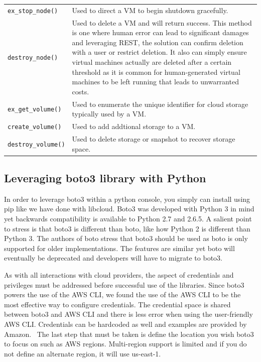 \begin{table}[htb]
\begin{tabular} {p{2.5cm}|p{5cm}}
\verb|ex_stop_node()| & Used to direct a VM to begin shutdown gracefully.\\

\verb|destroy_node()| & Used to delete a VM and will return success. This
method is
one where human error can lead to significant damages and leveraging REST, the
solution can confirm deletion with a user or restrict deletion. It also can
simply ensure virtual machines actually are deleted after a certain threshold
as
it is common for human-generated virtual machines to be left running that leads
to unwarranted costs.\\

\verb|ex_get_volume()| & Used to enumerate the unique identifier for cloud
storage
typically used by a VM.\\

\verb|create_volume()| & Used to add addtional storage to a VM.\\

\verb|destroy_volume()| & Used to delete storage or snapshot to recover
storage space.\\
\end{tabular}
\end{table}

\subsection{Leveraging boto3 library with Python}

In order to leverage boto3 within a python console, you simply can install
using
pip like we have done with libcloud. Boto3 was developed with Python 3 in mind
yet backwards compatibility is available to Python 2.7 and 2.6.5. A salient
point to stress is that boto3 is different than boto, like how Python 2 is
different than Python 3. The authors of boto stress that boto3 should be used
as
boto is only supported for older implementations. The features are similar yet
boto will eventually be deprecated and developers will have to migrate to
boto3.~\cite{hid-sp18-518-AWS-boto3}

As with all interactions with cloud providers, the aspect of credentials and
privileges must be addressed before successful use of the libraries. Since
boto3
powers the use of the AWS CLI, we found the use of the AWS CLI to be the most
effective way to configure credentials. The credential space is shared between
boto3 and AWS CLI and there is less error when using the user-friendly AWS CLI.
Credentials can be hardcoded as well and examples are provided by
Amazon.~\cite{hid-sp18-518-Boto3} The last step that must be taken is define
the
location you wish boto3 to focus on such as AWS regions. Multi-region support
is
limited and if you do not define an alternate region, it will use us-east-1.

